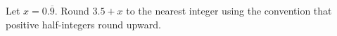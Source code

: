 Let $x=0.\overline 9$. Round $3.5+x$ to the nearest integer using the convention that positive half-integers round upward.
